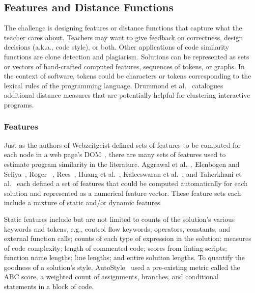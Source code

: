 \subsection{Features and Distance Functions}

The challenge is designing features or distance functions that capture what the teacher cares about. Teachers may want to give feedback on correctness, design decisions (a.k.a., code style), or both. Other applications of code similarity functions are clone detection and plagiarism. Solutions can be represented as sets or vectors of hand-crafted computed features, sequences of tokens, or graphs. In the context of software, tokens could be characters or tokens corresponding to the lexical rules of the programming language. Drummond et al.~\cite{drummond2014learning} catalogues additional distance measures that are potentially helpful for clustering interactive programs.

\subsubsection{Features}
Just as the authors of Webzeitgeist defined sets of features to be computed for each node in a web page's DOM~\cite{webzeitgeist}, there are many sets of features used to estimate program similarity in the literature. Aggrawal et al.~\cite{srikant2014system}, Elenbogen and Seliya~\cite{Elenbogen}, Roger ~\cite{ACESthesis}, Rees~\cite{Rees:1982}, Huang et al.~\cite{MOOCshop}, Kaleeswaran et al.~\cite{kaleeswaran2016semi}, and Taherkhani et al.~\cite{taherkhani2010recognizing} each defined a set of features that could be computed automatically for each solution and represented as a numerical feature vector. These feature sets each include a mixture of static and/or dynamic features.

Static features include but are not limited to counts of the solution's various keywords and tokens, e.g., control flow keywords, operators, constants, and external function calls; counts of each type of expression in the solution;  measures of code complexity; length of commented code; scores from linting scripts; function name lengths; line lengths; and entire solution lengths. To quantify the goodness of a solution's style, AutoStyle~\cite{choudhury2016autostyle} used a pre-existing metric called the ABC score, a weighted count of assignments, branches, and conditional statements in a block of code.

